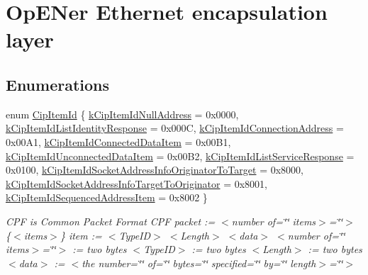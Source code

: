 \hypertarget{group__ENCAP}{\section{\-Op\-E\-Ner \-Ethernet encapsulation layer}
\label{d4/d91/group__ENCAP}
}
\subsection*{\-Enumerations}
\begin{DoxyCompactItemize}
\item 
enum \hyperlink{group__ENCAP_gafdcff621008b5e305165424c6ac4ea25}{\-Cip\-Item\-Id} \{ \*
\hyperlink{group__ENCAP_ggafdcff621008b5e305165424c6ac4ea25a7d3d1f2d6b2f4ed65dc34b792bfdaa4f}{k\-Cip\-Item\-Id\-Null\-Address} =  0x0000, 
\hyperlink{group__ENCAP_ggafdcff621008b5e305165424c6ac4ea25aa082d77e86c75c44df304252971b4007}{k\-Cip\-Item\-Id\-List\-Identity\-Response} =  0x000\-C, 
\hyperlink{group__ENCAP_ggafdcff621008b5e305165424c6ac4ea25a0adf8007a319941f3aaa7d9624025c0f}{k\-Cip\-Item\-Id\-Connection\-Address} =  0x00\-A1, 
\hyperlink{group__ENCAP_ggafdcff621008b5e305165424c6ac4ea25a8761662aa0838fb723f8696e9ea4e217}{k\-Cip\-Item\-Id\-Connected\-Data\-Item} =  0x00\-B1, 
\*
\hyperlink{group__ENCAP_ggafdcff621008b5e305165424c6ac4ea25a9b966ac289a5c11fc80a2ab274c99a19}{k\-Cip\-Item\-Id\-Unconnected\-Data\-Item} =  0x00\-B2, 
\hyperlink{group__ENCAP_ggafdcff621008b5e305165424c6ac4ea25a43d8fa4dfdd73a9a23c8a75330d7b162}{k\-Cip\-Item\-Id\-List\-Service\-Response} =  0x0100, 
\hyperlink{group__ENCAP_ggafdcff621008b5e305165424c6ac4ea25a93851549b6af1ed796409633e8071623}{k\-Cip\-Item\-Id\-Socket\-Address\-Info\-Originator\-To\-Target} =  0x8000, 
\hyperlink{group__ENCAP_ggafdcff621008b5e305165424c6ac4ea25aef2e6ffe3e7443b14842d173c7f1e75d}{k\-Cip\-Item\-Id\-Socket\-Address\-Info\-Target\-To\-Originator} =  0x8001, 
\*
\hyperlink{group__ENCAP_ggafdcff621008b5e305165424c6ac4ea25a21abefabf9f64dba055671507015f2b1}{k\-Cip\-Item\-Id\-Sequenced\-Address\-Item} =  0x8002
 \}
\begin{DoxyCompactList}\small\item\em \-C\-P\-F is \-Common \-Packet \-Format \-C\-P\-F packet \-:= $<$number of=\char`\"{}\char`\"{} items$>$=\char`\"{}\char`\"{}$>$ \{$<$items$>$\} item \-:= $<$\-Type\-I\-D$>$ $<$\-Length$>$ $<$data$>$ $<$number of=\char`\"{}\char`\"{} items$>$=\char`\"{}\char`\"{}$>$ \-:= two bytes $<$\-Type\-I\-D$>$ \-:= two bytes $<$\-Length$>$ \-:= two bytes $<$data$>$ \-:= $<$the number=\char`\"{}\char`\"{} of=\char`\"{}\char`\"{} bytes=\char`\"{}\char`\"{} specified=\char`\"{}\char`\"{} by=\char`\"{}\char`\"{} length$>$=\char`\"{}\char`\"{}$>$ \end{DoxyCompactList}\end{DoxyCompactItemize}
